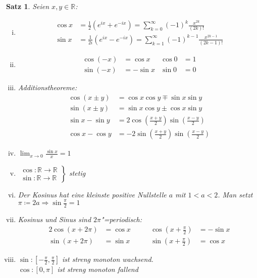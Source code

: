 \documentclass[ngerman,titlepage,twoside, parskip=half*]{scrreprt}
\newcommand*{\R}{\mathbb{R}}
\theoremstyle{break}
\newtheorem{theorem}{Satz}[section]
\theoremstyle{nonumberbreak}
\begin{document}
\begin{theorem}
  Seien $x,y\in\R$:
  \begin{enumerate}[i)]
  \item \begin{align*}
      \cos x &= \frac{1}{2}(e^{ix}+e^{-ix})= \sum_{k=0}^\infty
      (-1)^k \frac{x^{2k}}{(2k)!}\\
      \sin x &= \frac{1}{2i}(e^{ix}-e^{-ix}) = \sum_{k=1}^\infty
      (-1)^{k-1}\frac{x^{2k-1}}{(2k-1)!}
    \end{align*}
  \item \begin{align*}
    \cos (-x) & = \cos x & \cos 0 &= 1\\
    \sin (-x) & = -\sin x & \sin 0 &=0
  \end{align*}
  \item Additionstheoreme:
  \begin{align*}
    \cos (x\pm y) & = \cos x \cos y \mp \sin x \sin y\\
    \sin (x\pm y) & = \sin x \cos y \pm \cos x \sin y\\
    \sin x - \sin y & = 2\cos (\frac{x+y}{2})\sin (\frac{x-y}{2})\\
    \cos x - \cos y & = -2\sin (\frac{x+y}{2})\sin(\frac{x-y}{2})
  \end{align*}
  \item $\lim_{x\rightarrow 0} \frac{\sin x}{x}=1$
  \item $\left.\begin{array}{rcl}
    \cos \colon\R\rightarrow\R\\
    \sin \colon \R\rightarrow\R\end{array}\right\}$ stetig
  \item Der Kosinus hat eine kleinste positive Nullstelle $a$ mit $1<a<2$. Man setzt $\pi\coloneqq2a\Rightarrow
    \sin \frac{\pi}{2}=1$
  \item Kosinus und Sinus sind $2\pi$"=periodisch:
    \begin{alignat*}{2}
      \cos (x+2\pi) & = \cos x & \qquad \cos (x+\frac{\pi}{2}) & = -\sin x\\
      \sin (x+2\pi) & = \sin x & \qquad \sin (x+\frac{\pi}{2}) & = \cos x
    \end{alignat*}
  \item $\sin \colon [-\frac{\pi}{2},\frac{\pi}{2}]$ ist streng monoton wachsend.\\
    $\cos \colon [0,\pi]$ ist streng monoton fallend
\end{enumerate}
\end{theorem}
\end{document}
